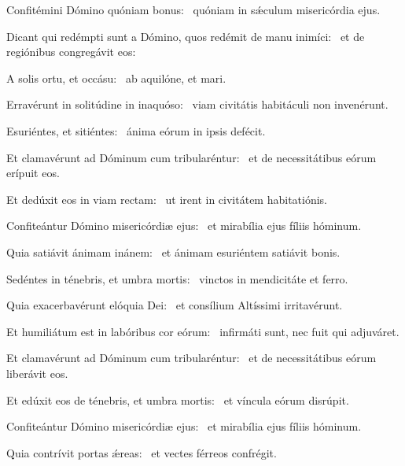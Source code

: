 \item Confitémini Dómino quóniam bonus:~\psstar{} quóniam in sǽculum misericórdia ejus.

\item Dicant qui redémpti sunt a Dómino, quos redémit de manu inimíci:~\psstar{} et de regiónibus congregávit eos:

\item A solis ortu, et occásu:~\psstar{} ab aquilóne, et mari.

\item Erravérunt in solitúdine in inaquóso:~\psstar{} viam civitátis habitáculi non invenérunt.

\item Esuriéntes, et sitiéntes:~\psstar{} ánima eórum in ipsis defécit.

\item Et clamavérunt ad Dóminum cum tribularéntur:~\psstar{} et de necessitátibus eórum erípuit eos.

\item Et dedúxit eos in viam rectam:~\psstar{} ut irent in civitátem habitatiónis.

\item Confiteántur Dómino misericórdiæ ejus:~\psstar{} et mirabília ejus fíliis hóminum.

\item Quia satiávit ánimam inánem:~\psstar{} et ánimam esuriéntem satiávit bonis.

\item Sedéntes in ténebris, et umbra mortis:~\psstar{} vinctos in mendicitáte et ferro.

\item Quia exacerbavérunt elóquia Dei:~\psstar{} et consílium Altíssimi irritavérunt.

\item Et humiliátum est in labóribus cor eórum:~\psstar{} infirmáti sunt, nec fuit qui adjuváret.

\item Et clamavérunt ad Dóminum cum tribularéntur:~\psstar{} et de necessitátibus eórum liberávit eos.

\item Et edúxit eos de ténebris, et umbra mortis:~\psstar{} et víncula eórum disrúpit.

\item Confiteántur Dómino misericórdiæ ejus:~\psstar{} et mirabília ejus fíliis hóminum.

\item Quia contrívit portas ǽreas:~\psstar{} et vectes férreos confrégit.


